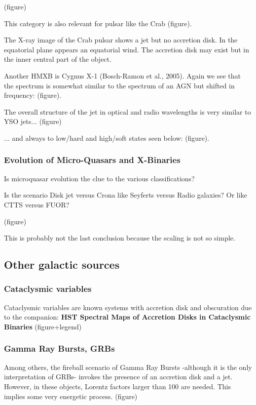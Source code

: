 \documentclass[10pt,a4paper,english]{article}
\begin{document}
(figure)

This category is also relevant for pulsar like the Crab (figure).

The X-ray image of the Crab pulsar shows a jet but no accretion disk. In the equatorial plane appears an equatorial wind. The accretion disk may exist but in the inner central part of the object.

Another HMXB is Cygnus X-1 (Bosch-Ramon et al., 2005). Again we see that the spectrum is somewhat similar to the spectrum of an AGN but shifted in frequency: (figure).

The overall structure of the jet in optical and radio wavelengths is very similar to YSO jets... (figure)

... and always to low/hard and high/soft states seen below: (figure).

\subsubsection{Evolution of Micro-Quasars and X-Binaries}
Is microquasar evolution the clue to the various classifications?

Is the scenario Disk jet versus Crona like Seyferts versus Radio galaxies? Or like CTTS versus FUOR?

(figure)

This is probably not the last conclusion because the scaling is not so simple.

\subsection{Other galactic sources}
\subsubsection{Cataclysmic variables}
Cataclysmic variables are known systems with accretion disk and obscuration due to the companion: \textbf{HST Spectral Maps of Accretion Disks in Cataclysmic Binaries} (figure+legend)

\subsubsection{Gamma Ray Bursts, GRBs}
Among others, the fireball scenario of Gamma Ray Bursts -although it is the only interpretation of GRBs- invokes the presence of an accretion disk and a jet. However, in these objects, Lorentz factors larger than 100 are needed. This implies some very energetic process. (figure)
\end{document}
